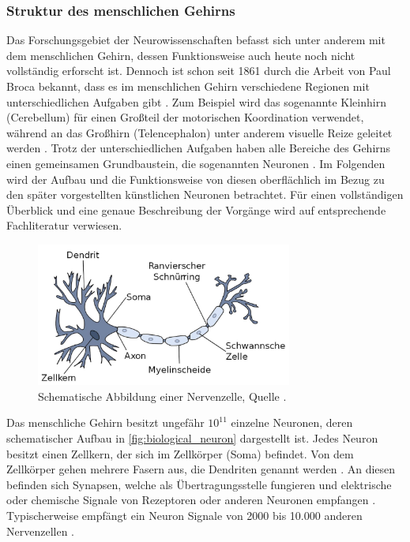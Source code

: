 \subsubsection{Struktur des menschlichen Gehirns}
Das Forschungsgebiet der Neurowissenschaften befasst sich unter anderem mit dem menschlichen Gehirn, dessen Funktionsweise auch heute noch nicht vollständig erforscht ist. Dennoch ist schon seit 1861 durch die Arbeit von Paul Broca bekannt, dass es im menschlichen Gehirn verschiedene Regionen mit unterschiedlichen Aufgaben gibt \cite{russell2013kunstliche}. Zum Beispiel wird das sogenannte Kleinhirn (Cerebellum) für einen Großteil der motorischen Koordination verwendet, während an das Großhirn (Telencephalon) unter anderem visuelle Reize geleitet werden \cite{kriesel2008kleiner}. Trotz der unterschiedlichen Aufgaben haben alle Bereiche des Gehirns einen gemeinsamen Grundbaustein, die sogenannten Neuronen \cite{russell2013kunstliche}. Im Folgenden wird der Aufbau und die Funktionsweise von diesen oberflächlich im Bezug zu den später vorgestellten künstlichen Neuronen betrachtet. Für einen vollständigen Überblick und eine genaue Beschreibung der Vorgänge wird auf entsprechende Fachliteratur verwiesen.\\
\begin{figure}[h]
	\centering
	\includegraphics[width=0.75\textwidth]{./img/biologial_neuron.JPG} 
	\caption{Schematische Abbildung einer Nervenzelle, Quelle \cite{kriesel2008kleiner}.}
	\label{fig:biological_neuron}
\end{figure}
Das menschliche Gehirn besitzt ungefähr ${10}^{11}$ einzelne Neuronen, deren schematischer Aufbau in \autoref{fig:biological_neuron} dargestellt ist. Jedes Neuron besitzt einen Zellkern, der sich im Zellkörper (Soma) befindet. Von dem Zellkörper gehen mehrere Fasern aus, die Dendriten genannt werden \cite{russell2013kunstliche}. An diesen befinden sich Synapsen, welche als Übertragungsstelle fungieren und elektrische oder chemische Signale von Rezeptoren oder anderen Neuronen empfangen \cite{kriesel2008kleiner}. Typischerweise empfängt ein Neuron Signale von 2000 bis 10.000 anderen Nervenzellen \cite{zell2003simulation}. \\
